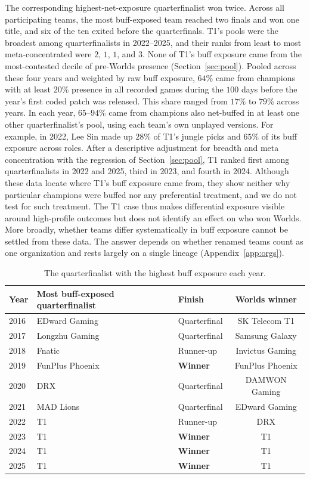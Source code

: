 \documentclass[11pt]{article}
\begin{document}
The corresponding highest-net-exposure quarterfinalist won twice. Across all participating teams, the most buff-exposed team reached two finals and won one title, and six of the ten exited before the quarterfinals. T1's pools were the broadest among quarterfinalists in 2022--2025, and their ranks from least to most meta-concentrated were $2$, $1$, $1$, and $3$. None of T1's buff exposure came from the most-contested decile of pre-Worlds presence (Section~\ref{sec:pool}). Pooled across these four years and weighted by raw buff exposure, $64\%$ came from champions with at least $20\%$ presence in all recorded games during the $100$ days before the year's first coded patch was released. This share ranged from $17\%$ to $79\%$ across years. In each year, $65$--$94\%$ came from champions also net-buffed in at least one other quarterfinalist's pool, using each team's own unplayed versions. For example, in 2022, Lee Sin made up $28\%$ of T1's jungle picks and $65\%$ of its buff exposure across roles. After a descriptive adjustment for breadth and meta concentration with the regression of Section~\ref{sec:pool}, T1 ranked first among quarterfinalists in 2022 and 2025, third in 2023, and fourth in 2024. Although these data locate where T1's buff exposure came from, they show neither why particular champions were buffed nor any preferential treatment, and we do not test for such treatment. The T1 case thus makes differential exposure visible around high-profile outcomes but does not identify an effect on who won Worlds. More broadly, whether teams differ systematically in buff exposure cannot be settled from these data. The answer depends on whether renamed teams count as one organization and rests largely on a single lineage (Appendix~\ref{app:orgs}).

\begin{table}[htbp]
\centering
\small
\caption{The quarterfinalist with the highest buff exposure each year.}
\label{tab:champions}
\begin{tabular}{lllc}
\toprule
Year & Most buff-exposed quarterfinalist & Finish & Worlds winner \\
\midrule
2016 & EDward Gaming & Quarterfinal & SK Telecom T1 \\
2017 & Longzhu Gaming & Quarterfinal & Samsung Galaxy \\
2018 & Fnatic & Runner-up & Invictus Gaming \\
2019 & FunPlus Phoenix & \textbf{Winner} & FunPlus Phoenix \\
2020 & DRX & Quarterfinal & DAMWON Gaming \\
2021 & MAD Lions & Quarterfinal & EDward Gaming \\
2022 & T1 & Runner-up & DRX \\
2023 & T1 & \textbf{Winner} & T1 \\
2024 & T1 & \textbf{Winner} & T1 \\
2025 & T1 & \textbf{Winner} & T1 \\
\bottomrule
\end{tabular}
\end{table}
\end{document}
